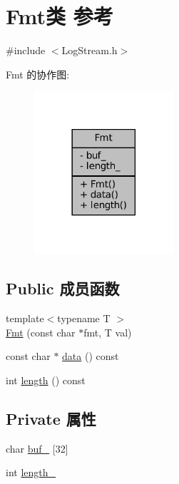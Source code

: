 \hypertarget{classmuduo_1_1Fmt}{}\section{Fmt类 参考}
\label{classmuduo_1_1Fmt}


{\ttfamily \#include $<$Log\+Stream.\+h$>$}



Fmt 的协作图\+:
\nopagebreak
\begin{figure}[H]
\begin{center}
\leavevmode
\includegraphics[width=146pt]{classmuduo_1_1Fmt__coll__graph}
\end{center}
\end{figure}
\subsection*{Public 成员函数}
\begin{DoxyCompactItemize}
\item 
{\footnotesize template$<$typename T $>$ }\\\hyperlink{classmuduo_1_1Fmt_a06d5ef710a16a0d6256f8fe44ef18055}{Fmt} (const char $\ast$fmt, T val)
\item 
const char $\ast$ \hyperlink{classmuduo_1_1Fmt_a39a256207a84f316547e36c755373d03}{data} () const
\item 
int \hyperlink{classmuduo_1_1Fmt_a91213974fa3ac3959b1c355a9e588f8d}{length} () const
\end{DoxyCompactItemize}
\subsection*{Private 属性}
\begin{DoxyCompactItemize}
\item 
char \hyperlink{classmuduo_1_1Fmt_a126f015f392ef682c26bb6f0f732f57e}{buf\+\_\+} \mbox{[}32\mbox{]}
\item 
int \hyperlink{classmuduo_1_1Fmt_a4bac9b810d0cf891c8fcbc974e989739}{length\+\_\+}
\end{DoxyCompactItemize}



